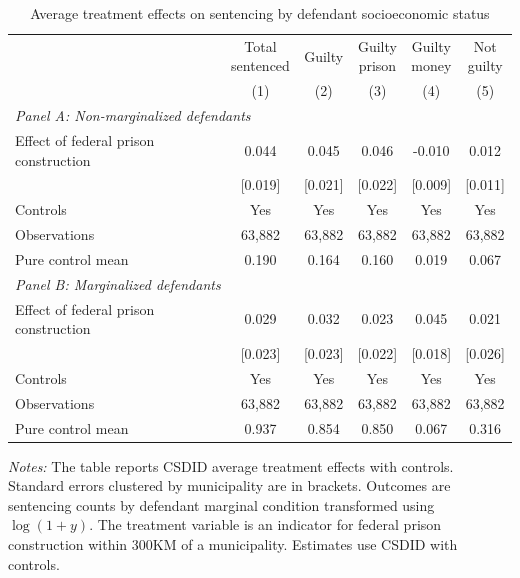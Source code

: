 \begin{table}[!htpb]\centering
\caption{Average treatment effects on sentencing by defendant socioeconomic status}
\label{tab:att_marginalized_sentencing}
\scriptsize
\begin{threeparttable}
\begin{tabular}{@{\extracolsep{0pt}}lccccc}
\hline\hline
 & \shortstack{Total\\ sentenced} & Guilty & \shortstack{Guilty\\ prison} & \shortstack{Guilty\\ money} & \shortstack{Not\\ guilty} \\
 & (1) & (2) & (3) & (4) & (5) \\
\hline
\multicolumn{6}{l}{\textit{Panel A: Non-marginalized defendants}} \\
Effect of federal prison construction & 0.044 & 0.045 & 0.046 & -0.010 & 0.012 \\
 & [0.019] & [0.021] & [0.022] & [0.009] & [0.011] \\
Controls & Yes & Yes & Yes & Yes & Yes \\
Observations & 63,882 & 63,882 & 63,882 & 63,882 & 63,882 \\
Pure control mean & 0.190 & 0.164 & 0.160 & 0.019 & 0.067 \\
\hline
\multicolumn{6}{l}{\textit{Panel B: Marginalized defendants}} \\
Effect of federal prison construction & 0.029 & 0.032 & 0.023 & 0.045 & 0.021 \\
 & [0.023] & [0.023] & [0.022] & [0.018] & [0.026] \\
Controls & Yes & Yes & Yes & Yes & Yes \\
Observations & 63,882 & 63,882 & 63,882 & 63,882 & 63,882 \\
Pure control mean & 0.937 & 0.854 & 0.850 & 0.067 & 0.316 \\
\hline\hline
\end{tabular}
\begin{minipage}{0.95\textwidth}
\footnotesize \emph{Notes:} The table reports CSDID average treatment effects with controls. Standard errors clustered by municipality are in brackets. Outcomes are sentencing counts by defendant marginal condition transformed using \(\log(1+y)\). The treatment variable is an indicator for federal prison construction within 300KM of a municipality. Estimates use CSDID with controls.
\end{minipage}
\end{threeparttable}
\end{table}
